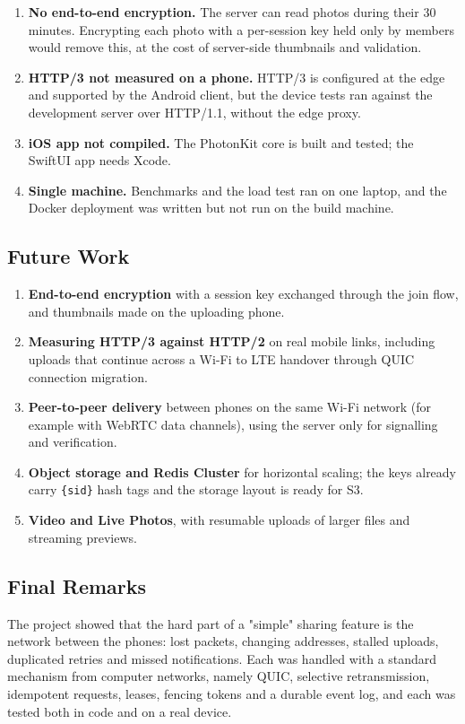 \begin{enumerate}
  \item \textbf{No end-to-end encryption.} The server can read photos during their 30 minutes. Encrypting each photo with a per-session key held only by members would remove this, at the cost of server-side thumbnails and validation.
  \item \textbf{HTTP/3 not measured on a phone.} HTTP/3 is configured at the edge and supported by the Android client, but the device tests ran against the development server over HTTP/1.1, without the edge proxy.
  \item \textbf{iOS app not compiled.} The PhotonKit core is built and tested; the SwiftUI app needs Xcode.
  \item \textbf{Single machine.} Benchmarks and the load test ran on one laptop, and the Docker deployment was written but not run on the build machine.
\end{enumerate}

\subsection{Future Work}

\begin{enumerate}
  \item \textbf{End-to-end encryption} with a session key exchanged through the join flow, and thumbnails made on the uploading phone.
  \item \textbf{Measuring HTTP/3 against HTTP/2} on real mobile links, including uploads that continue across a Wi-Fi to LTE handover through QUIC connection migration.
  \item \textbf{Peer-to-peer delivery} between phones on the same Wi-Fi network (for example with WebRTC data channels), using the server only for signalling and verification.
  \item \textbf{Object storage and Redis Cluster} for horizontal scaling; the keys already carry \texttt{\{sid\}} hash tags and the storage layout is ready for S3.
  \item \textbf{Video and Live Photos}, with resumable uploads of larger files and streaming previews.
\end{enumerate}

\subsection{Final Remarks}

The project showed that the hard part of a "simple" sharing feature is the network between the phones: lost packets, changing addresses, stalled uploads, duplicated retries and missed notifications. Each was handled with a standard mechanism from computer networks, namely QUIC, selective retransmission, idempotent requests, leases, fencing tokens and a durable event log, and each was tested both in code and on a real device.
